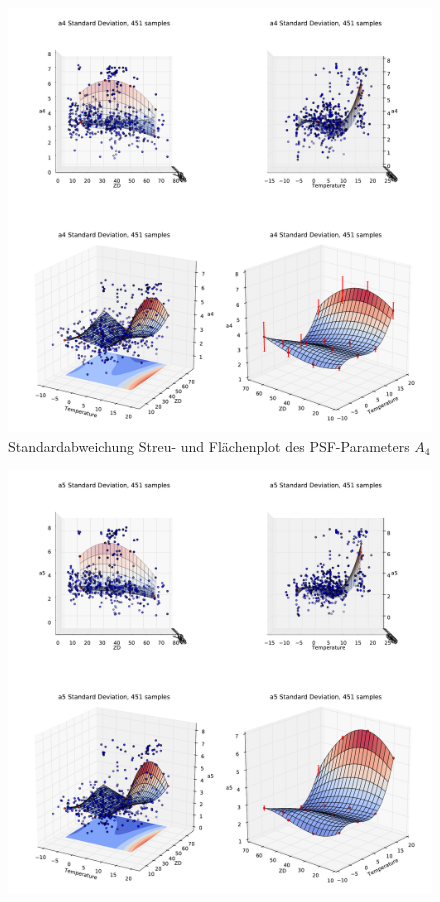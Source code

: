 \begin{appendix}
\begin{figure}[H]
	\centering
	\includegraphics[scale=.48]{psf_surf/a4_std.pdf}
	\caption[Standardabweichung Streu- und Flächenplot des PSF-Parameters $A_4$]{Standardabweichung Streu- und Flächenplot des PSF-Parameters $A_4$}
    \label{psf_surf_a4_std}
\end{figure}
\begin{figure}[H]
	\centering
	\includegraphics[scale=.48]{psf_surf/a5_std.pdf}

\end{figure}
\end{appendix}
